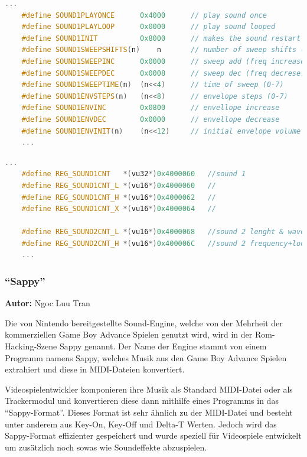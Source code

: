 \documentclass[11pt,a4paper]{scrartcl}
\newcommand{\AutorNgoc} {
    \vspace{-4mm}
    \large \textbf{Autor:} Ngoc Luu Tran \normalsize
    \vspace{2mm}
}
\begin{document}
\vspace{5mm}
\begin{lstlisting}[language=C++, caption={1. Ausschnitt aus Belogic gba.h}, label={list:gbaheader2}]
    ...
	#define SOUND1PLAYONCE		0x4000		// play sound once
	#define SOUND1PLAYLOOP		0x0000		// play sound looped
	#define SOUND1INIT			0x8000		// makes the sound restart
	#define SOUND1SWEEPSHIFTS(n)	n		// number of sweep shifts (0-7)
	#define SOUND1SWEEPINC		0x0000		// sweep add (freq increase)
	#define SOUND1SWEEPDEC		0x0008		// sweep dec (freq decrese)
	#define SOUND1SWEEPTIME(n)	(n<<4)		// time of sweep (0-7)
	#define SOUND1ENVSTEPS(n)	(n<<8)		// envelope steps (0-7)
	#define SOUND1ENVINC		0x0800		// envellope increase
	#define SOUND1ENVDEC		0x0000		// envellope decrease
	#define SOUND1ENVINIT(n)	(n<<12)		// initial envelope volume (0-15)
	...
\end{lstlisting}
\newpage
\vspace{5mm}
\begin{lstlisting}[language=C++, caption={2. Ausschnitt aus Belogic gba.h}, label={list:gbaheader1}]
    ...
	#define REG_SOUND1CNT   *(vu32*)0x4000060	//sound 1
	#define REG_SOUND1CNT_L *(vu16*)0x4000060	//
	#define REG_SOUND1CNT_H *(vu16*)0x4000062	//
	#define REG_SOUND1CNT_X *(vu16*)0x4000064	//

	#define REG_SOUND2CNT_L *(vu16*)0x4000068	//sound 2 lenght & wave duty
	#define REG_SOUND2CNT_H *(vu16*)0x400006C	//sound 2 frequency+loop+reset
	...
\end{lstlisting}


\subsubsection{\enquote{Sappy}}
\AutorNgoc

Die von Nintendo bereitgestellte Sound-Engine, welche von der Mehrheit der kommerziellen Game Boy Advance Spielen genutzt wird, wird in der Rom-Hacking-Szene Sappy genannt. 
Der Name der Engine stammt von einem Programm namens Sappy, welches Musik aus den Game Boy Advance Spielen extrahiert und diese in MIDI-Dateien konvertiert.


Videospielentwickler komponieren ihre Musik als Standard MIDI-Datei oder als Trackermodul und konvertieren diese dann mithilfe eines Programms in das \enquote{Sappy-Format}. Dieses Format ist sehr \"ahnlich zu der MIDI-Datei und besteht unter anderem aus Key-On, Key-Off und Delta-T Werten. Jedoch wird das Sappy-Format effizienter gespeichert und wurde speziell f\"ur Videospiele entwickelt um zus\"atzlich noch sowas wie Soundeffekte abzuspielen.
\end{document}
